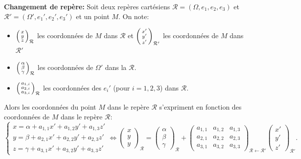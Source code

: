 \sld{\vfill\pagebreak[5]}%


\bigskip

\begin{remark}{\bf\sffamily Changement de repère:} \label{rem_cdr} Soit deux repères cartésiens $\mathcal R =(\Omega,e_1,e_2,e_3) $ et $\mathcal R' =(\Omega',e_1',e_2',e_3') $ et un point $M$. On note:
\begin{itemize}
	\item $\begin{psmallmatrix}x\\ y \\z \end{psmallmatrix}_{\mathcal R}$ les coordonnées de $M$ dans $\mathcal R$ et $\begin{psmallmatrix}x'\\y'\\z' \end{psmallmatrix}_{\mathcal R'}$ les coordonnées de $M$ dans $\mathcal R'$
	\item $\begin{psmallmatrix}\alpha\\\beta\\\gamma \end{psmallmatrix}_{\mathcal R}$ les coordonnées de $\Omega'$ dans la $\mathcal R$.
	\item $\begin{psmallmatrix} a_{1,i}\\a_{2,i}\\a_{3,i} \end{psmallmatrix}_{\mathcal R}$ les coordonnées des $e_i'$ (pour $i=1,2,3$) dans $\mathcal R$.
\end{itemize}
Alors les coordonnées du point $M$ dans le repère $\mathcal R$ s'expriment en fonction des coordonnées de $M$ dans le repère $\mathcal R$:
\[
	\begin{cases}
		x = \alpha +a_{1,1}x'+ a_{1,2}y' +a_{1,3} z'\\
		y = \beta  +a_{2,1}x'+ a_{2,2}y' +a_{2,3} z'\\
		z = \gamma +a_{3,1}x'+ a_{3,2}y' +a_{3,3} z'
	\end{cases} \Leftrightarrow \begin{pmatrix}
		x\\y\\y
	\end{pmatrix}_{\mathcal R}=\begin{pmatrix}
		\alpha\\\beta\\\gamma
	\end{pmatrix}_{\mathcal R}+ \begin{pmatrix}
		a_{1,1} & a_{1,2} & a_{1,3}\\
		a_{2,1} & a_{2,2}& a_{2,3} \\
		a_{3,1} & a_{3,2} & a_{3,3}
	\end{pmatrix}_{\mathcal R \leftarrow \mathcal R'} \begin{pmatrix}
		x'\\y'\\z'
	\end{pmatrix}_{\mathcal R'}.
\]
\end{remark}

